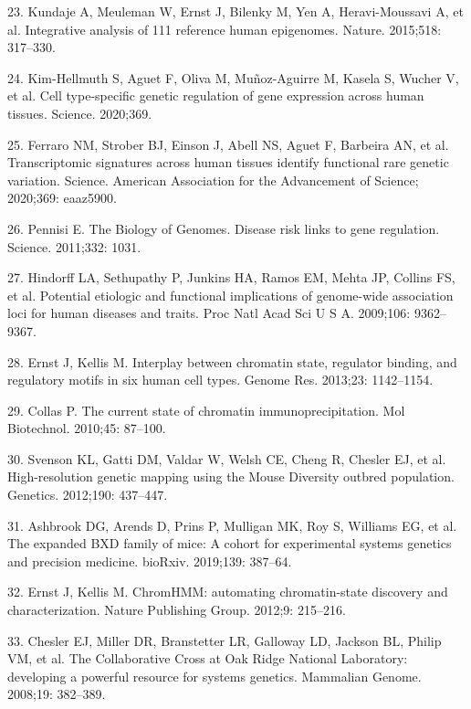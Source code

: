\documentclass[10pt,letterpaper]{article}
\newenvironment{cslreferences}%
  {}%
  {\par}
\begin{document}
\begin{cslreferences}
\leavevmode\hypertarget{ref-pmid25693563}{}%
23. Kundaje A, Meuleman W, Ernst J, Bilenky M, Yen A, Heravi-Moussavi A,
et al. Integrative analysis of 111 reference human epigenomes. Nature.
2015;518: 317--330.

\leavevmode\hypertarget{ref-pmid32913075}{}%
24. Kim-Hellmuth S, Aguet F, Oliva M, Muñoz-Aguirre M, Kasela S, Wucher
V, et al. Cell type-specific genetic regulation of gene expression
across human tissues. Science. 2020;369.

\leavevmode\hypertarget{ref-pmid32913073}{}%
25. Ferraro NM, Strober BJ, Einson J, Abell NS, Aguet F, Barbeira AN, et
al. Transcriptomic signatures across human tissues identify functional
rare genetic variation. Science. American Association for the
Advancement of Science; 2020;369: eaaz5900.

\leavevmode\hypertarget{ref-pmid21617055}{}%
26. Pennisi E. The Biology of Genomes. Disease risk links to gene
regulation. Science. 2011;332: 1031.

\leavevmode\hypertarget{ref-pmid19474294}{}%
27. Hindorff LA, Sethupathy P, Junkins HA, Ramos EM, Mehta JP, Collins
FS, et al. Potential etiologic and functional implications of
genome-wide association loci for human diseases and traits. Proc Natl
Acad Sci U S A. 2009;106: 9362--9367.

\leavevmode\hypertarget{ref-pmid23595227}{}%
28. Ernst J, Kellis M. Interplay between chromatin state, regulator
binding, and regulatory motifs in six human cell types. Genome Res.
2013;23: 1142--1154.

\leavevmode\hypertarget{ref-pmid20077036}{}%
29. Collas P. The current state of chromatin immunoprecipitation. Mol
Biotechnol. 2010;45: 87--100.

\leavevmode\hypertarget{ref-Svenson:2012hq}{}%
30. Svenson KL, Gatti DM, Valdar W, Welsh CE, Cheng R, Chesler EJ, et
al. High-resolution genetic mapping using the Mouse Diversity outbred
population. Genetics. 2012;190: 437--447.

\leavevmode\hypertarget{ref-Ashbrook:2019bd}{}%
31. Ashbrook DG, Arends D, Prins P, Mulligan MK, Roy S, Williams EG, et
al. The expanded BXD family of mice: A cohort for experimental systems
genetics and precision medicine. bioRxiv. 2019;139: 387--64.

\leavevmode\hypertarget{ref-Ernst:2012ii}{}%
32. Ernst J, Kellis M. ChromHMM: automating chromatin-state discovery
and characterization. Nature Publishing Group. 2012;9: 215--216.

\leavevmode\hypertarget{ref-Chesler:2008ge}{}%
33. Chesler EJ, Miller DR, Branstetter LR, Galloway LD, Jackson BL,
Philip VM, et al. The Collaborative Cross at Oak Ridge National
Laboratory: developing a powerful resource for systems genetics.
Mammalian Genome. 2008;19: 382--389.


\end{cslreferences}
\end{document}
